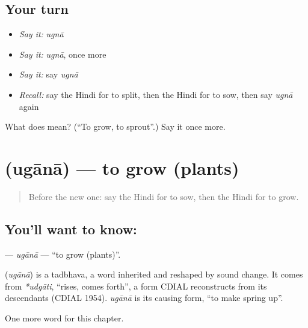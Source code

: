 \subsection*{Your turn}
\begin{itemize}
\raggedright
  \item \emph{Say it:} \emph{ugnā}
  \item \emph{Say it:} \emph{ugnā}, once more
  \item \emph{Say it:} say \emph{ugnā}
  \item \emph{Recall:} say the Hindi for to split, then the Hindi for to sow, then say \emph{ugnā} again
\end{itemize}

\begin{tcolorbox}[breakable,colback=teal!4,colframe=teal!35!black,title={Before you move on}]
What does  mean? (\textquotedblleft{}To grow, to sprout\textquotedblright{}.) Say it once more.
\end{tcolorbox}
\section[\texorpdfstring{\hi{उगाना} (ugānā)}{उगाना (ugānā)}]{ (ugānā) — to grow (plants)}

\label{lesson:HI-C228-ugana}



\begin{quote}
Before the new one: say the Hindi for to sow, then the Hindi for to grow.
\end{quote}

\subsection*{You'll want to know: }
\textbf{} — \emph{ugānā} — \textquotedblleft{}to grow (plants)\textquotedblright{}.

\begin{cousinweb}
\textbf{} (\emph{ugānā}) is a tadbhava, a word inherited and reshaped by sound change. It comes from \emph{*udgāti}, \textquotedblleft{}rises, comes forth\textquotedblright{}, a form CDIAL reconstructs from its descendants (CDIAL 1954). \emph{ugānā} is its causing form, \textquotedblleft{}to make spring up\textquotedblright{}.
\end{cousinweb}

\begin{grammarlens}[title={What you've built}]
One more word for this chapter.
\end{grammarlens}

